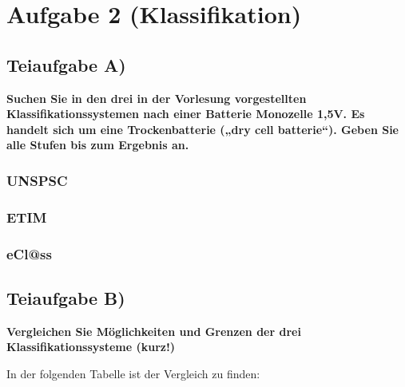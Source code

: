 \section{Aufgabe 2 (Klassifikation)}

\subsection{Teiaufgabe A)}
\textbf{Suchen Sie in den drei in der Vorlesung vorgestellten Klassifikationssystemen nach einer
Batterie Monozelle 1,5V. Es handelt sich um eine Trockenbatterie („dry cell batterie“).
Geben Sie alle Stufen bis zum Ergebnis an.}

\subsubsection{UNSPSC}
\subsubsection{ETIM}
\subsubsection{eCl@ss}


\subsection{Teiaufgabe B)}
\textbf{Vergleichen Sie Möglichkeiten und Grenzen der drei Klassifikationssysteme (kurz!)}

In der folgenden Tabelle ist der Vergleich zu finden:
\clearpage 